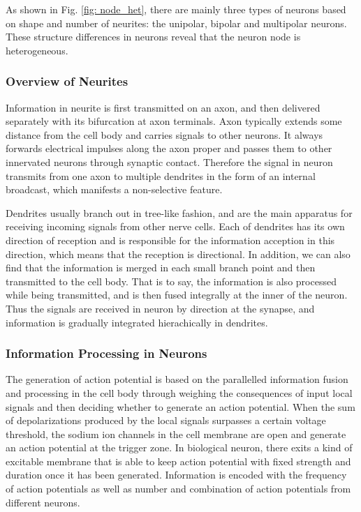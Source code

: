 \documentclass[journal,comsoc]{IEEEtran}
\begin{document}
	As shown in Fig. \ref{fig: node_het}, there are mainly three types of neurons based on shape and number of neurites: the unipolar, bipolar and multipolar neurons\cite{bear2007neuroscience}. 
	These structure differences in neurons reveal that the neuron node is heterogeneous.
	
	\subsubsection{Overview of Neurites}
	Information in neurite is first transmitted on an axon, and then delivered separately with its bifurcation at axon terminals. 
	Axon typically extends some distance from the cell body and carries signals to other neurons.
	It always forwards electrical impulses along the axon proper and passes them to other innervated neurons through synaptic contact. 
	Therefore the signal in neuron transmits from one axon to multiple dendrites in the form of an internal broadcast, which manifests a non-selective feature.
	
	Dendrites usually branch out in tree-like fashion, and are the main apparatus for receiving incoming signals from other nerve cells. 
	Each of dendrites has its own direction of reception and is responsible for the information acception in this direction, 
	which means that the reception is directional. 
	In addition, we can also find that the information is merged in each small branch point and then transmitted to the cell body.
	That is to say, the information is also processed while being transmitted,  and is then fused integrally at the inner of the neuron.
	Thus the signals are received in neuron by direction at the synapse, and information is gradually integrated hierachically in dendrites.				
	
	\subsubsection{Information Processing in Neurons}
	The generation of action potential is based on the parallelled information fusion and processing in the cell body through weighing the consequences of input local signals and then deciding whether to generate an action potential. 
	When the sum of depolarizations produced by the local signals surpasses a certain voltage threshold, the sodium ion channels in the cell membrane are open and generate an action potential at the trigger zone. 
	In biological neuron, there exits a kind of excitable membrane that is able to keep action potential with fixed strength and duration once it has been generated.
	Information is encoded with the frequency of action potentials as well as number and combination of action potentials from different neurons\cite{bear2007neuroscience}. 
	
\end{document}
